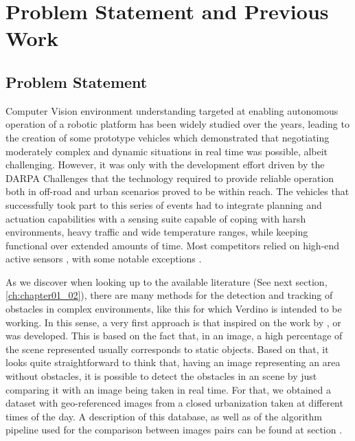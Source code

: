 
\graphicspath{{./images/chapter01/bmps/}{./images/chapter01/vects/}{./images/chapter01/}}

\chapter{Problem Statement and Previous Work}\label{ch:chapter01}

\section{Problem Statement}\label{ch:chapter01_01}

Computer Vision environment understanding targeted at enabling autonomous operation of a robotic platform has been widely studied over the years, leading to the creation of some prototype vehicles \cite{Maurer1996,Pomerleau1996,Broggi1999} which demonstrated that negotiating moderately complex and dynamic situations in real time was possible, albeit challenging. However, it was only with the development effort driven by the DARPA Challenges \cite{Buehler2007, Buehler2009} that the technology required to provide reliable operation both in off-road and urban scenarios proved to be within reach.
The vehicles that successfully took part to this series of events had to integrate planning and actuation capabilities with a sensing suite capable of coping with harsh environments, heavy traffic and wide temperature ranges, while keeping functional over extended amounts of time. Most competitors relied on high-end active sensors \cite{Urmson2008, Montemerlo2008, Bacha2008, Kammel2008}, with some notable exceptions \cite{Broggi2006, Broggi2010}. 

As we discover when looking up to the available literature (See next section, \ref{ch:chapter01_02}), there are many methods for the detection and tracking of obstacles in complex environments, like this for which Verdino is intended to be working. In this sense, a very first approach is that inspired on the work by \cite{primdahl2005change},  \cite{diego2011video} or \cite{vallespi2012prior} was developed. This is based on the fact that, in an image, a high percentage of the scene represented usually corresponds to static objects. Based on that, it looks quite straightforward to think that, having an image representing an area without obstacles, it is possible to detect the obstacles in an scene by just comparing it with an image being taken in real time. For that, we obtained a dataset with geo-referenced images from a closed urbanization taken at different times of the day. A description of this database, as well as of the algorithm pipeline used for the comparison between images pairs can be found at section \todo{ \ref{XXX} }.

